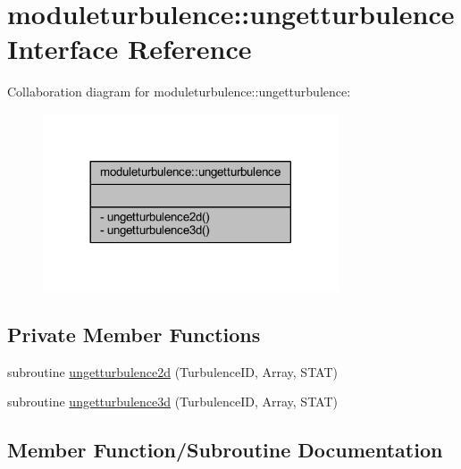 \hypertarget{interfacemoduleturbulence_1_1ungetturbulence}{}\section{moduleturbulence\+:\+:ungetturbulence Interface Reference}
\label{interfacemoduleturbulence_1_1ungetturbulence}


Collaboration diagram for moduleturbulence\+:\+:ungetturbulence\+:\nopagebreak
\begin{figure}[H]
\begin{center}
\leavevmode
\includegraphics[width=248pt]{interfacemoduleturbulence_1_1ungetturbulence__coll__graph}
\end{center}
\end{figure}
\subsection*{Private Member Functions}
\begin{DoxyCompactItemize}
\item 
subroutine \mbox{\hyperlink{interfacemoduleturbulence_1_1ungetturbulence_a3946d26a8b94fb1317afdb9d46ab879f}{ungetturbulence2d}} (Turbulence\+ID, Array, S\+T\+AT)
\item 
subroutine \mbox{\hyperlink{interfacemoduleturbulence_1_1ungetturbulence_a1ba4ee00dfb24289f993639fa39aa733}{ungetturbulence3d}} (Turbulence\+ID, Array, S\+T\+AT)
\end{DoxyCompactItemize}


\subsection{Member Function/\+Subroutine Documentation}
\mbox{\label{interfacemoduleturbulence_1_1ungetturbulence_a3946d26a8b94fb1317afdb9d46ab879f}} 
